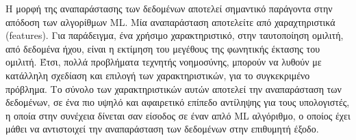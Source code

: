 Η μορφή της αναπαράστασης των δεδομένων αποτελεί σημαντικό παράγοντα στην
απόδοση των αλγορίθμων ML. Μία αναπαράσταση αποτελείτε από χαραχτηριστικά (features).
Για παράδειγμα, ένα χρήσιμο χαρακτηριστικό, στην ταυτοποίηση ομιλιτή, από δεδομένα ήχου,
είναι η εκτίμηση του μεγέθους της φωνητικής έκτασης του ομιλιτή.
Έτσι, πολλά προβλήματα τεχνητής νοημοσύνης, μπορούν να λυθούν
με κατάλληλη σχεδίαση και επιλογή των χαρακτηριστικών, για το συγκεκριμένο
πρόβλημα. Το σύνολο των χαρακτηριστικών αυτών αποτελεί την αναπαράσταση των δεδομένων,
σε ένα πιο υψηλό και αφαιρετικό επίπεδο αντίληψης για τους υπολογιστές, η οποία
στην συνέχεια δίνεται σαν είσοδος σε έναν απλό ML αλγόριθμο, ο οποίος έχει
μάθει να αντιστοιχεί την αναπαράσταση των δεδομένων στην επιθυμητή έξοδο.

